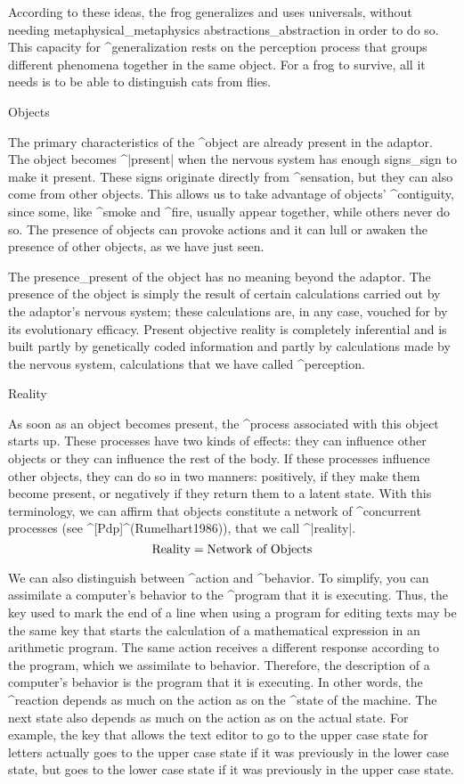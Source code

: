 According to these ideas, the frog generalizes and uses universals,
without needing metaphysical_{metaphysics} abstractions_{abstraction} in
order to do so. This capacity for ^{generalization} rests on the
perception process that groups different phenomena together in the same
object. For a frog to survive, all it needs is to be able to distinguish
cats from flies.


\Section Objects

The primary characteristics of the ^{object} are already present in the
adaptor. The object becomes ^|present| when the nervous system has
enough signs_{sign} to make it present. These signs originate directly
from ^{sensation}, but they can also come from other objects. This
allows us to take advantage of objects' ^{contiguity}, since some, like
^{smoke} and ^{fire}, usually appear together, while others never do so.
The presence of objects can provoke actions and it can lull or awaken
the presence of other objects, as we have just seen.

The presence_{present} of the object has no meaning beyond the adaptor.
The presence of the object is simply the result of certain calculations
carried out by the adaptor's nervous system; these calculations are, in
any case, vouched for by its evolutionary efficacy. Present objective
reality is completely inferential and is built partly by genetically
coded information and partly by calculations made by the nervous system,
calculations that we have called ^{perception}.


\Section Reality

As soon as an object becomes present, the ^{process} associated with
this object starts up. These processes have two kinds of effects: they
can influence other objects or they can influence the rest of the body.
If these processes influence other objects, they can do so in two
manners: positively, if they make them become present, or negatively if
they return them to a latent state. With this terminology, we can affirm
that objects constitute a network of ^{concurrent processes} (see
^[Pdp]^(Rumelhart1986)), that we call ^|reality|.
$$\hbox{Reality} = \hbox{Network of Objects}$$

We can also distinguish between ^{action} and ^{behavior}. To simplify,
you can assimilate a computer's behavior to the ^{program} that it is
executing. Thus, the key used to mark the end of a line when using a
program for editing texts may be the same key that starts the
calculation of a mathematical expression in an arithmetic program. The
same action receives a different response according to the program,
which we assimilate to behavior. Therefore, the description of a
computer's behavior is the program that it is executing. In other words,
the ^{reaction} depends as much on the action as on the ^{state} of the
machine. The next state also depends as much on the action as on the
actual state. For example, the key that allows the text editor to go to
the upper case state for letters actually goes to the upper case state
if it was previously in the lower case state, but goes to the lower case
state if it was previously in the upper case state.

